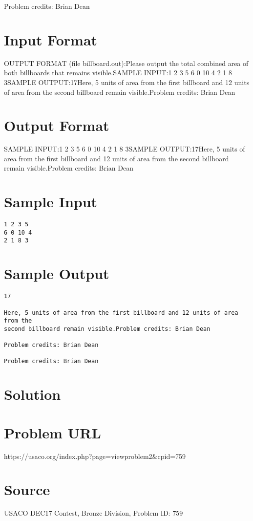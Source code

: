 \documentclass[12pt]{article}
\begin{document}
Problem credits: Brian Dean



\section*{Input Format}
OUTPUT FORMAT (file billboard.out):Please output the total combined area of both billboards that remains visible.SAMPLE INPUT:1 2 3 5
6 0 10 4
2 1 8 3SAMPLE OUTPUT:17Here, 5 units of area from the first billboard and 12 units of area from the 
second billboard remain visible.Problem credits: Brian Dean

\section*{Output Format}
SAMPLE INPUT:1 2 3 5
6 0 10 4
2 1 8 3SAMPLE OUTPUT:17Here, 5 units of area from the first billboard and 12 units of area from the 
second billboard remain visible.Problem credits: Brian Dean

\section*{Sample Input}
\begin{verbatim}
1 2 3 5
6 0 10 4
2 1 8 3
\end{verbatim}

\section*{Sample Output}
\begin{verbatim}
17

Here, 5 units of area from the first billboard and 12 units of area from the 
second billboard remain visible.Problem credits: Brian Dean

Problem credits: Brian Dean

Problem credits: Brian Dean
\end{verbatim}

\section*{Solution}


\section*{Problem URL}
https://usaco.org/index.php?page=viewproblem2&cpid=759

\section*{Source}
USACO DEC17 Contest, Bronze Division, Problem ID: 759
\end{document}

